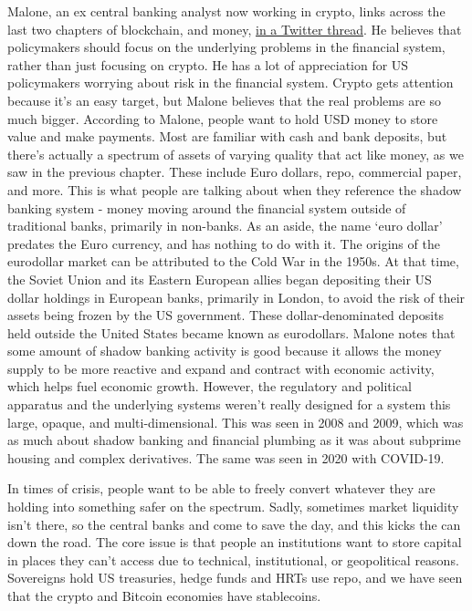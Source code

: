 Malone, an ex central banking analyst now working in crypto, links across the last two chapters of blockchain, and money, \href{https://twitter.com/brendanpmalone/status/1628067806984937472}{in a Twitter thread}. He believes that policymakers should focus on the underlying problems in the financial system, rather than just focusing on crypto. He has a lot of appreciation for US policymakers worrying about risk in the financial system. Crypto gets  attention because it's an easy target, but Malone believes that the real problems are so much bigger. According to Malone, people want to hold USD money to store value and make payments. Most are familiar with cash and bank deposits, but there's actually a spectrum of assets of varying quality that act like money, as we saw in the previous chapter. These include Euro dollars, repo, commercial paper, and more. This is what people are talking about when they reference the shadow banking system - money moving around the financial system outside of traditional banks, primarily in non-banks. As an aside, the name `euro dollar' predates the Euro currency, and has nothing to do with it. The origins of the eurodollar market can be attributed to the Cold War in the 1950s. At that time, the Soviet Union and its Eastern European allies began depositing their US dollar holdings in European banks, primarily in London, to avoid the risk of their assets being frozen by the US government. These dollar-denominated deposits held outside the United States became known as eurodollars. Malone notes that some amount of shadow banking activity is good because it allows the money supply to be more reactive and expand and contract with economic activity, which helps fuel economic growth. However, the regulatory and political apparatus and the underlying systems weren't really designed for a system this large, opaque, and multi-dimensional. This was seen in 2008 and 2009, which was as much about shadow banking and financial plumbing as it was about subprime housing and complex derivatives. The same was seen in 2020 with COVID-19.\par
In times of crisis, people want to be able to freely convert whatever they are holding into something safer on the spectrum. Sadly, sometimes market liquidity isn't there, so the central banks and come to save the day, and this kicks the can down the road. The core issue is that people an institutions want to store capital in places they can't access due to technical, institutional, or geopolitical reasons. Sovereigns hold US treasuries, hedge funds and HRTs use repo, and we have seen that the crypto and Bitcoin economies have stablecoins.\par
